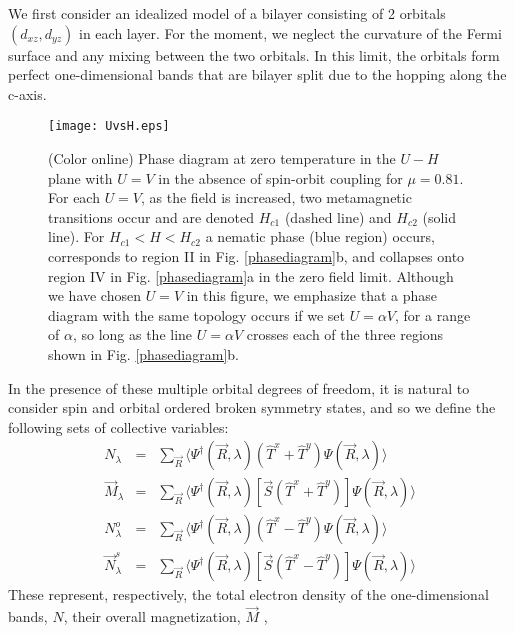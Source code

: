 \documentclass[prb,aps,amssymb,showpacs,twocolumn,amsmath,floatfix]{revtex4}
\begin{document}
We first consider an idealized model of a bilayer consisting of 2 orbitals $(d_{xz}, d_{yz})$ in each layer.  %
For the moment, we neglect the curvature of the Fermi surface and any mixing between the two orbitals.  %
In this 
limit, the orbitals form perfect one-dimensional bands that are bilayer split due to the hopping along 
the c-axis.   
\begin{figure}
\texttt{[image: UvsH.eps]}
\caption{ (Color online) Phase diagram at zero temperature in the  $U- H$ plane with $U=V$ in the absence 
of spin-orbit coupling for  $\mu = 0.81$.  For each $U=V$, as the field is increased, two metamagnetic transitions occur 
and are denoted $H_{c1}$ (dashed line) and $H_{c2}$ (solid line).  For $H_{c1} < H < H_{c2}$ a 
nematic phase (blue region) occurs, corresponds to region II in Fig. \ref{phasediagram}b,  and collapses onto region IV in Fig. \ref{phasediagram}a in the zero field limit.  
Although we have chosen $U=V$ in this figure, we emphasize that a phase diagram with the same 
topology occurs if we set $U= \alpha V$, for a range of $\alpha$, so long as the line $U= \alpha V$ crosses each of the three regions shown in Fig. \ref{phasediagram}b.    }
   \label{UvsH}
\end{figure} 
In  the 
presence of these multiple orbital degrees of freedom, it is natural to consider spin and orbital 
ordered broken symmetry states, and so we define the following sets of 
collective variables:
\begin{eqnarray}
\label{op}
  N_{\lambda} &=& \sum_{ \vec{R}} \langle \Psi^{\dagger}({\vec R} , \lambda) \left( \hat{T}^x + \hat{T}^y \right) \Psi({\vec R} , \lambda) \rangle \nonumber \\
  \vec{ M}_{\lambda} &=& \sum_{ \vec{R}} \langle \Psi^{\dagger}({\vec R} , \lambda) \left[ \vec{S} \left( \hat{T}^x + \hat{T}^y \right) \right] \Psi({\vec R} , \lambda) \rangle \nonumber \\
  N^o_{\lambda} &=& \sum_{ \vec{R}} \langle \Psi^{\dagger}({\vec R} , \lambda) \left( \hat{T}^x - \hat{T}^y \right) \Psi({\vec R} , \lambda) \rangle \nonumber \\
\vec{ N}^s_{\lambda} &=& \sum_{ \vec{R}} \langle \Psi^{\dagger}({\vec R} , \lambda) \left[ \vec{S} \left( \hat{T}^x - \hat{T}^y \right) \right] \Psi({\vec R} , \lambda) \rangle 
  \end{eqnarray}
These represent, respectively, the total electron density of the one-dimensional bands, $N$, their overall magnetization, $\vec{M}$ , 
\end{document}
